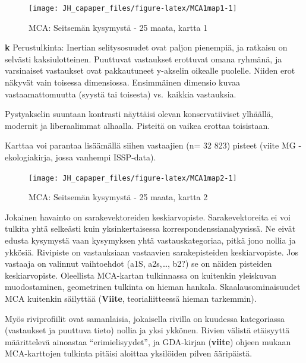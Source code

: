 \documentclass[
  finnish,
]{book}
\begin{document}
\begin{figure}

{\centering \texttt{[image: JH\_capaper\_files/figure-latex/MCA1map1-1]} 

}

\caption{MCA: Seitsemän kysymystä - 25 maata, kartta 1}\label{fig:MCA1map1}
\end{figure}

\textbf{k} Perustulkinta: Inertian selitysosuudet ovat paljon pienempiä,
ja ratkaisu on selvästi kaksiulotteinen. Puuttuvat vastaukset erottuvat
omana ryhmänä, ja varsinaiset vastaukset ovat pakkautuneet y-akselin
oikealle puolelle. Niiden erot näkyvät vain toisessa dimensiossa.
Ensimmäinen dimensio kuvaa vastaamattomuutta (syystä tai toisesta)
vs.~kaikkia vastauksia.

Pystyakselin suuntaan kontrasti näyttäisi olevan konservatiiviset
ylhäällä, modernit ja liberaalimmat alhaalla. Pisteitä on vaikea erottaa
toisistaan.

Karttaa voi parantaa lisäämällä siihen vastaajien (n= 32 823) pisteet
(viite MG - ekologiakirja, jossa vanhempi ISSP-data).

\begin{figure}

{\centering \texttt{[image: JH\_capaper\_files/figure-latex/MCA1map2-1]} 

}

\caption{MCA: Seitsemän kysymystä - 25 maata, kartta 2}\label{fig:MCA1map2}
\end{figure}

Jokainen havainto on sarakevektoreiden keskiarvopiste. Sarakevektoreita
ei voi tulkita yhtä selkeästi kuin yksinkertaisessa
korrespondenssianalyysissä. Ne eivät edusta kysymystä vaan kysymyksen
yhtä vastauskategoriaa, pitkä jono nollia ja ykkösiä. Rivipiste on
vastauksiaan vastaavien sarakepisteiden keskiarvopiste. Jos vastaaja on
valinnut vaihtoehdot (a1S, a2s,\ldots, b2?) se on näiden pisteiden
keskiarvopiste. Oleellista MCA-kartan tulkinnassa on kuitenkin
yleiskuvan muodostaminen, geometrinen tulkinta on hieman hankala.
Skaalausominaisuudet MCA kuitenkin säilyttää (\textbf{Viite},
teorialiitteessä hieman tarkemmin).

Myös riviprofiilit ovat samanlaisia, jokaisella rivilla on kuudessa
kategoriassa (vastaukset ja puuttuva tieto) nollia ja yksi ykkönen.
Rivien välistä etäisyyttä määrittelevä ainoastaa ``erimielisyydet'', ja
GDA-kirjan (\textbf{viite}) ohjeen mukaan MCA-karttojen tulkinta pitäisi
aloittaa yksilöiden pilven ääripäistä.
\end{document}
